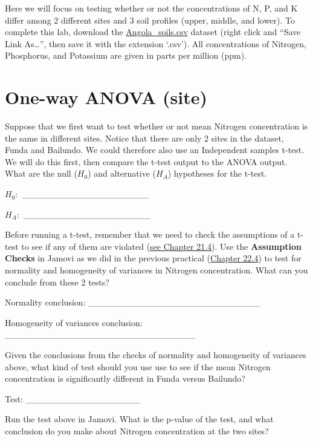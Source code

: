 \documentclass[
]{scrbook}
\begin{document}
Here we will focus on testing whether or not the concentrations of N, P, and K differ among 2 different sites and 3 soil profiles (upper, middle, and lower).
To complete this lab, download the \href{https://raw.githubusercontent.com/bradduthie/SCIU4T4/main/data/Angola_soils.csv}{Angola\_soils.csv} dataset (right click and ``Save Link As\ldots{}'', then save it with the extension `.csv').
All concentrations of Nitrogen, Phosphorus, and Potassium are given in parts per million (ppm).

\hypertarget{one-way-anova-site}{%
\section{One-way ANOVA (site)}\label{one-way-anova-site}}

Suppose that we first want to test whether or not mean Nitrogen concentration is the same in different sites.
Notice that there are only 2 sites in the dataset, Funda and Bailundo.
We could therefore also use an Independent samples t-test.
We will do this first, then compare the t-test output to the ANOVA output.
What are the null (\(H_{0}\)) and alternative (\(H_{A}\)) hypotheses for the t-test.

\(H_{0}:\) \_\_\_\_\_\_\_\_\_\_\_\_\_\_\_\_\_\_\_\_

\(H_{A}:\) \_\_\_\_\_\_\_\_\_\_\_\_\_\_\_\_\_\_\_\_

Before running a t-test, remember that we need to check the assumptions of a t-test to see if any of them are violated (\protect\hyperlink{assumptions-of-t-tests}{see Chapter 21.4}).
Use the \textbf{Assumption Checks} in Jamovi as we did in the previous practical (\protect\hyperlink{independent-samples-t-test-1}{Chapter 22.4}) to test for normality and homogeneity of variances in Nitrogen concentration.
What can you conclude from these 2 tests?

Normality conclusion: \_\_\_\_\_\_\_\_\_\_\_\_\_\_\_\_\_\_\_\_\_\_\_\_\_\_\_

Homogeneity of variances conclusion: \_\_\_\_\_\_\_\_\_\_\_\_\_\_\_\_\_\_\_\_\_\_\_\_\_\_\_\_\_\_

Given the conclusions from the checks of normality and homogeneity of variances above, what kind of test should you use use to see if the mean Nitrogen concentration is significantly different in Funda versus Bailundo?

Test: \_\_\_\_\_\_\_\_\_\_\_\_\_\_\_\_\_\_

Run the test above in Jamovi.
What is the p-value of the test, and what conclusion do you make about Nitrogen concentration at the two sites?
\end{document}
